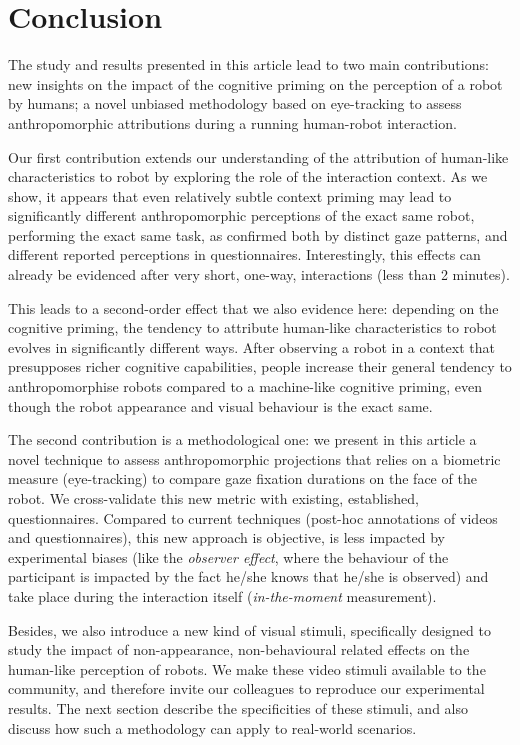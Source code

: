 \documentclass[lettersize, noapacite, twoside, HRI]{apa_HRI}
\begin{document}
\section{Conclusion}
\label{conclusion}

The study and results presented in this article lead to two main contributions:
new insights on the impact of the cognitive priming on the perception of a robot
by humans; a novel unbiased methodology based on eye-tracking to assess
anthropomorphic attributions during a running human-robot interaction.

Our first contribution extends our understanding of the attribution of
human-like characteristics to robot by exploring the role of the interaction
context. As we show, it appears that even relatively subtle context
priming may lead to significantly different anthropomorphic perceptions of
the exact same robot, performing the exact same task, as confirmed both by
distinct gaze patterns, and different reported perceptions in questionnaires.
Interestingly, this effects can already be evidenced after very short,
one-way, interactions (less than 2 minutes).

This leads to a second-order effect that we also evidence here: depending on the
cognitive priming, the tendency to attribute human-like characteristics to robot
evolves in significantly different ways. After observing a robot in a
context that presupposes richer cognitive capabilities, people increase
their general tendency to anthropomorphise robots compared to a machine-like
cognitive priming, even though the robot appearance and visual behaviour is the
exact same.

The second contribution is a methodological one: we present in this article
a novel technique to assess anthropomorphic projections that relies on a
biometric measure (eye-tracking) to compare gaze fixation durations on
the face of the robot. We cross-validate this new metric with existing,
established, questionnaires. Compared to current techniques (post-hoc
annotations of videos and questionnaires), this new approach is objective,
is less impacted by experimental biases (like the \emph{observer effect},
where the behaviour of the participant is impacted by the fact he/she knows that
he/she is observed) and take place during the interaction itself
(\emph{in-the-moment} measurement).

Besides, we also introduce a new kind of visual stimuli, specifically designed
to study the impact of non-appearance, non-behavioural related effects on the
human-like perception of robots. We make these video stimuli available to the
community, and therefore invite our colleagues to reproduce our experimental
results. The next section describe the specificities of these stimuli, and also
discuss how such a methodology can apply to real-world scenarios.
\end{document}
